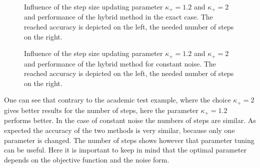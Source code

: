 \begin{figure}[ht]%
	\begin{subfigure}{0.49\textwidth}
	\end{subfigure}
	\begin{subfigure}{0.49\textwidth}
	\end{subfigure}
	\caption{Influence of the step size updating parameter \(\kappa_+ = 1.2\) and \(\kappa_+ =2 \) and performance of the hybrid method in the exact case. The reached accuracy is depicted on the left, the needed number of steps on the right.}
	\label{fig_no_noise_comp}
\end{figure}

\begin{figure}[ht]%
	\begin{subfigure}{0.49\textwidth}
	\end{subfigure}
	\begin{subfigure}{0.49\textwidth}
	\end{subfigure}
	\caption{Influence of the step size updating parameter \(\kappa_+ = 1.2\) and \(\kappa_+ =2 \) and performance of the hybrid method for constant noise. The reached accuracy is depicted on the left, the needed number of steps on the right.}
	\label{fig_const_noise_comp}
\end{figure}


One can see that contrary to the academic test example, where the choice \(\kappa_+ = 2\) gives better results for the number of steps, here the parameter \(\kappa_+=1.2\) performs better.
In the case of constant noise the numbers of steps are similar.
As  expected the accuracy of the two methods is very similar, because only one parameter is changed. The number of steps shows however that parameter tuning can be useful. Here it is important to keep in mind that the optimal parameter depends on the objective function and the noise form.

